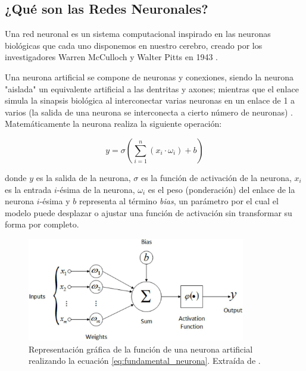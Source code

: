 \documentclass[../main.tex]{subfiles}
\begin{document}
\subsection{¿Qué son las Redes Neuronales?}

Una red neuronal es un sistema computacional inspirado en las neuronas biológicas que cada uno disponemos en nuestro cerebro, creado por los investigadores Warren McCulloch y Walter Pitts en 1943 \cite{PonceCruz2010}. \newline

Una neurona artificial se compone de neuronas y conexiones, siendo la neurona "aislada" un equivalente artificial a las dentritas y axones; mientras que el enlace simula la sinapsis biológica al interconectar varias neuronas en un enlace de 1 a varios (la salida de una neurona se interconecta a cierto número de neuronas) \cite{SerradillaGarcia2016}. Matemáticamente la neurona realiza la siguiente operación:

\begin{equation}
    y = \sigma(\sum_{i=1}^{n}(x_{i}\cdot \omega_{i}) + b)
    \label{eq:fundamental_neurona}
\end{equation}

donde $y$ es la salida de la neurona, $\sigma$ es la función de activación de la neurona, $x_{i}$ es la entrada $i$-ésima de la neurona, $\omega_{i}$ es el peso (ponderación) del enlace de la neurona $i$-ésima y $b$ representa al término \textit{bias}, un parámetro por el cual el modelo puede desplazar o ajustar una función de activación sin transformar su forma por completo.

\begin{figure}[h]
    \centering
    \includegraphics[width=0.85\textwidth]{imagenes/Neurona.jpeg}
    \caption[Representación gráfica de la función de una neurona artificial.]{Representación gráfica de la función de una neurona artificial realizando la ecuación \ref{eq:fundamental_neurona}. Extraída de \cite{Mendoza2019}.}
    \label{fig:neurona_artificial_proceso}
\end{figure}
\end{document}

